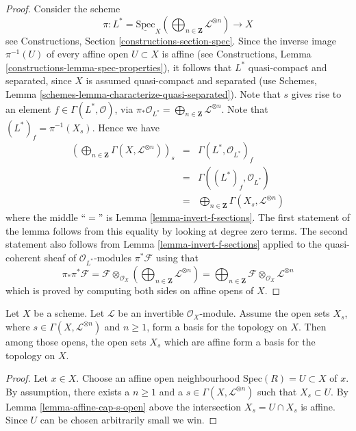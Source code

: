 \begin{proof}
Consider the scheme
$$
\pi :
L^* = \underline{\text{Spec}}_X\left(
\bigoplus\nolimits_{n \in \mathbf{Z}} \mathcal{L}^{\otimes n}
\right)
\longrightarrow
X
$$
see Constructions, Section \ref{constructions-section-spec}.
Since the inverse image $\pi^{-1}(U)$ of every affine open
$U \subset X$ is affine (see
Constructions, Lemma \ref{constructions-lemma-spec-properties}),
it follows that $L^*$ quasi-compact and separated,
since $X$ is assumed quasi-compact and separated (use
Schemes, Lemma \ref{schemes-lemma-characterize-quasi-separated}).
Note that $s$ gives rise to an element $f \in \Gamma(L^*, \mathcal{O})$, via
$\pi_*\mathcal{O}_{L^*} =
\bigoplus_{n \in \mathbf{Z}} \mathcal{L}^{\otimes n}$.
Note that $(L^*)_f = \pi^{-1}(X_s)$. Hence we have
\begin{eqnarray*}
\left(
\bigoplus\nolimits_{n \in \mathbf{Z}} \Gamma(X, \mathcal{L}^{\otimes n})
\right)_s
& = &
\Gamma(L^*, \mathcal{O}_{L^*})_f \\
& = &
\Gamma((L^*)_f, \mathcal{O}_{L^*}) \\
& = &
\bigoplus\nolimits_{n \in \mathbf{Z}} \Gamma(X_s, \mathcal{L}^{\otimes n})
\end{eqnarray*}
where the middle ``$ = $'' is Lemma \ref{lemma-invert-f-sections}.
The first statement of the lemma follows from this equality by looking at
degree zero terms. The second statement also follows
from Lemma \ref{lemma-invert-f-sections} applied to the quasi-coherent sheaf
of $\mathcal{O}_{L^*}$-modules $\pi^*\mathcal{F}$ using that
$$
\pi_*\pi^*\mathcal{F} =
\mathcal{F} \otimes_{\mathcal{O}_X}
\left(\bigoplus\nolimits_{n \in \mathbf{Z}} \mathcal{L}^{\otimes n}\right) =
\bigoplus\nolimits_{n \in \mathbf{Z}}
\mathcal{F} \otimes_{\mathcal{O}_X} \mathcal{L}^{\otimes n}
$$
which is proved by computing both sides on affine opens of $X$.
\end{proof}

\begin{lemma}
\label{lemma-affine-s-opens}
Let $X$ be a scheme. Let $\mathcal{L}$ be an invertible $\mathcal{O}_X$-module.
Assume the open sets $X_s$, where $s \in \Gamma(X, \mathcal{L}^{\otimes n})$
and $n \geq 1$, form a basis for the topology on $X$.
Then among those opens, the open sets $X_s$ which are affine
form a basis for the topology on $X$.
\end{lemma}

\begin{proof}
Let $x \in X$. Choose an affine open neighbourhood
$\text{Spec}(R) = U \subset X$ of $x$.
By assumption, there exists
a $n \geq 1$ and a $s \in \Gamma(X, \mathcal{L}^{\otimes n})$
such that $X_s \subset U$. By Lemma \ref{lemma-affine-cap-s-open} above
the intersection $X_s = U \cap X_s$ is affine.
Since $U$ can be chosen arbitrarily small we win.
\end{proof}

